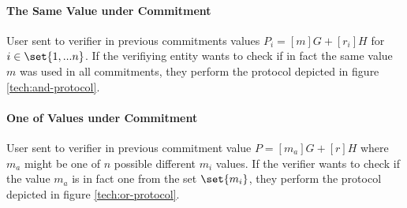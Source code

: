 \paragraph{The Same Value under Commitment}
User sent to verifier in previous commitments values $P_i = [m]G + [r_i]H$ for $i \in \set{1, ...n}$. If the verifiying entity wants to check if in fact the same value $m$ was used in all commitments, they perform the protocol depicted in figure \ref{tech:and-protocol}.



\paragraph{One of Values under Commitment}
User sent to verifier in previous commitment value $P = [m_a]G + [r]H$ where $m_a$ might be one of $n$ possible different $m_i$ values. If the verifier wants to check if the value $m_a$ is in fact one from the set $\set{m_i}$, they perform the protocol depicted in figure \ref{tech:or-protocol}.

